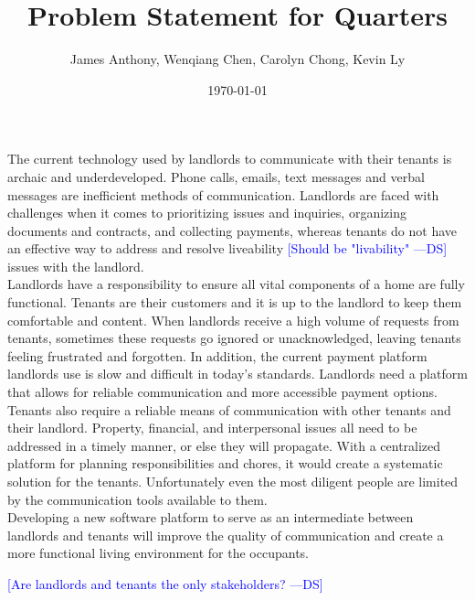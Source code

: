 \documentclass[12pt]{article}
\newcommand{\authornote}[3]{\textcolor{#1}{[#3 ---#2]}}
\newcommand{\authornote}[3]{}
\newcommand{\ds}[1]{\authornote{blue}{DS}{#1}}
\begin{document}
\title{Problem Statement for Quarters} 
\author{James Anthony, Wenqiang Chen, Carolyn Chong, Kevin Ly}
\date{\today}
	
\maketitle

The current technology used by landlords to communicate with their tenants is 
archaic and underdeveloped. Phone calls, emails, text messages and verbal 
messages are inefficient methods of communication. Landlords are faced with 
challenges when it comes to prioritizing issues and inquiries, organizing 
documents and contracts, and collecting payments, whereas tenants do not have an 
effective way to address and resolve liveability \ds{Should be "livability"} 
issues with the landlord. \\

Landlords have a responsibility to ensure all vital components of a home are 
fully functional. Tenants are their customers and it is up to the landlord to 
keep them comfortable and content. When landlords receive a high volume of 
requests from tenants, sometimes these requests go ignored or unacknowledged, 
leaving tenants feeling 
frustrated and forgotten. 
In addition, the current payment platform landlords use is slow and difficult 
in today's standards. 
Landlords need a platform that allows for reliable communication and more 
accessible payment options. \\

Tenants also require a reliable means of communication with other tenants and their 
landlord. Property, financial, and interpersonal issues all need to be addressed 
in a timely manner, or else they will propagate. With a centralized 
platform for planning responsibilities and chores, it would create a systematic 
solution for the tenants. Unfortunately even the most diligent people are limited 
by the communication tools available to them. \\

Developing a new software platform to serve as an intermediate between 
landlords and tenants will improve the quality of communication 
and create a more functional living environment for the occupants.

\ds{Are landlords and tenants the only stakeholders?}
\end{document}
